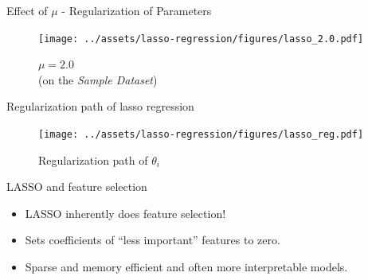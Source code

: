 \documentclass{beamer}
\begin{document}
\begin{frame}{Effect of $\mu$ - Regularization of Parameters}
\vspace{0.4cm}
\begin{figure}\texttt{[image: ../assets/lasso-regression/figures/lasso\_2.0.pdf]}\caption{$\mu = 2.0$\\(on the \emph{Sample Dataset})}
\end{figure}
\end{frame}

{
	
}


%
%
%
%
%
%
%
%
%
%

\begin{frame}{Regularization path of lasso regression}
\begin{figure}
    \centering
    \texttt{[image: ../assets/lasso-regression/figures/lasso\_reg.pdf]}
    \caption{Regularization path of $\theta_{i}$}
    \label{fig:my_label}
\end{figure}

\end{frame}


\begin{frame}{LASSO and feature selection}
\begin{itemize}[<+->]
	\item LASSO inherently does feature selection!
	\item Sets coefficients of ``less important'' features to zero.
	\item Sparse and memory efficient and often more interpretable models.
\end{itemize}
\end{frame}
\end{document}
